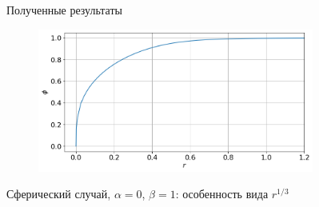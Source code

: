 \begin{frame}{Полученные результаты}
\vspace{-0.5cm}
\begin{figure}
	\includegraphics[width=0.81\textwidth]{figures/result_volumes_sph_p.png}
\end{figure}
\vspace{-0.7cm}
\begin{center}
	Сферический случай, $\alpha = 0$, $\beta = 1$: особенность вида $r^{1/3}$
\end{center}
\end{frame}